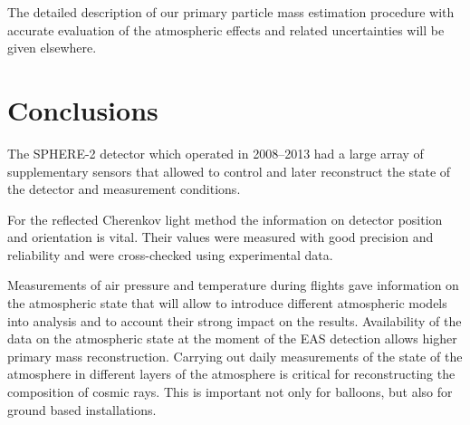 \documentclass[universe,article,submit,moreauthors,pdftex]{Definitions/mdpi}
\begin{document}
\begin{paracol}{2}
The detailed description of our primary particle mass estimation procedure with accurate evaluation of the atmospheric effects and related uncertainties will be given elsewhere. 


\section{Conclusions \label{sect:conclusions}}
The SPHERE-2 detector which operated in 2008--2013 had a large array of supplementary sensors that allowed to control and later reconstruct the state of the detector and measurement conditions. 

For the reflected Cherenkov light method the information on detector position and orientation is vital. Their values were measured with good precision and reliability and were cross-checked using experimental data.

Measurements of air pressure and temperature during flights gave information on the atmospheric state that will allow to introduce different atmospheric models into analysis and to account their strong impact on the results. Availability of the data on the atmospheric state at the moment of the EAS detection allows higher primary mass reconstruction. Carrying out daily measurements of the state of the atmosphere in different layers of the atmosphere is critical for reconstructing the composition of cosmic rays. This is important not only for balloons, but also for ground based installations.


  


\end{paracol}

%

\end{document}
